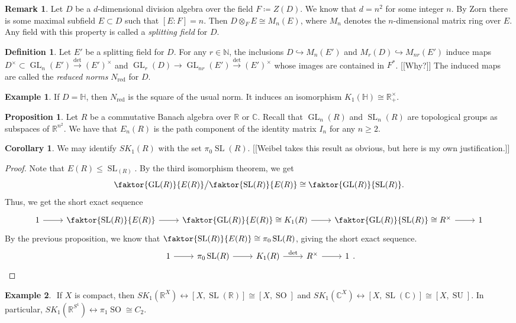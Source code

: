 \documentclass[10pt,letterpaper,cm]{nupset}
\theoremstyle{definition}
\newtheorem*{definition}{Definition}
\newtheorem{exmp}{Example}
\newtheorem{remark}{Remark}
\newtheorem{corollary}{Corollary}
\newtheorem{prop}{Proposition}
\newcommand{\C}{\mathbb C}
\renewcommand{\H}{\mathbb H}
\newcommand{\N}{\mathbb N}
\newcommand{\R}{\mathbb R}
\newcommand{\1}{\mathbf{1}}
\newcommand{\0}{\vec 0}
\DeclareMathOperator*{\GL}{GL}
\DeclareMathOperator*{\SL}{SL}
\DeclareMathOperator*{\SO}{SO}
\DeclareMathOperator*{\SU}{SU}
\DeclareMathOperator{\red}{red}
\begin{document}
\begin{remark}
Let $D$ be a $d$-dimensional division algebra over the field $F\coloneqq Z(D)$. We know that $d =n^2$ for some integer $n$. By Zorn there is some maximal subfield $E\subset D$ such that $[E : F] = n$. Then $D \otimes_F E \cong M_n(E)$, where $M_n$ denotes the $n$-dimensional matrix ring over $E$. Any field with this property is called a \textit{splitting field} for $D$.
\end{remark}

\begin{definition}
Let $E'$ be a splitting field for $D$. For any $r \in \N$, the inclusions $D \hookrightarrow M_n(E')$ and $M_r(D) \hookrightarrow M_{nr}(E')$ induce maps $D^{\times}\subset \GL_n(E') \overset{\det}{\longrightarrow} (E')^{\times}$ and $\GL_r(D)\to \GL_{nr}(E')  \overset{\det}{\longrightarrow} (E')^{\times}$ whose images are contained in $F^{\ast}$. {[[Why?]]} The induced maps are called the \textit{reduced norms} $N_{\red}$ for $D$.
\end{definition}

\begin{exmp}
If $D = \H$, then $N_{\red}$ is the square of the usual norm. It induces an isomorphism $K_1(\H) \cong \R_+^{\times}$.
\end{exmp}

\begin{prop}
Let $R$ be a commutative Banach algebra over $\R$ or $\C$. Recall that $\GL_n(R)$ and $\SL_n(R)$ are topological groups as subspaces of $\R^{n^2}$. We have that $E_n(R)$ is the path component of the identity matrix $I_n$ for any $n\geq 2$.
\end{prop}

\begin{corollary}
We may identify $SK_1(R)$ with the set $\pi_0\SL(R)$. {[[Weibel takes this result as obvious, but here is my own justification.]]}
\end{corollary}
\begin{proof}
Note that $E(R)\leq \SL_(R)$. By the third isomorphism theorem, we get $$ \faktor{\GL(R)}{E(R)}\big / \faktor{\SL(R)}{E(R)} \cong \faktor{\GL(R)}{\SL(R)}.$$ Thus, we get the short exact sequence 
\[
\begin{tikzcd}
1 \arrow[r] & \faktor{\SL(R)}{E(R)} \arrow[r] & \faktor{\GL(R)}{E(R)}\cong K_1(R) \arrow[r] & \faktor{\GL(R)}{\SL(R)} \cong R^{\times} \arrow[r] & 1
\end{tikzcd}
\]
By the previous proposition, we know that $\faktor{\SL(R)}{E(R)} \cong \pi_0\SL(R)$, giving the short exact sequence.
\[
\begin{tikzcd}
1 \arrow[r] & \pi_0\SL(R) \arrow[r] & K_1(R) \arrow[r, "\det"] & R^{\times} \arrow[r] & 1
\end{tikzcd}.
\]
\end{proof}
\begin{exmp} $ $
If $X$ is compact, then $SK_1(\R^X) \leftrightarrow [X, \SL(\R)] \cong [X, \SO]$ and $SK_1(\C^X) \leftrightarrow [X, \SL(\C)] \cong [X, \SU]$.
In particular, $SK_1(\R^{S^1}) \leftrightarrow \pi_1 \SO \cong C_2$.
\end{exmp}
\end{document}
